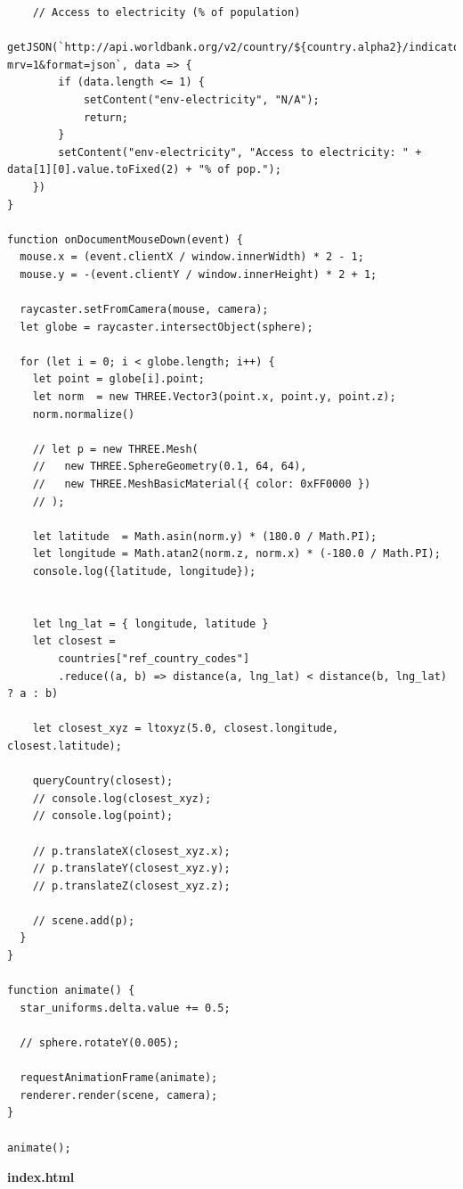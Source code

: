 \begin{lstlisting}
    // Access to electricity (% of population)
    getJSON(`http://api.worldbank.org/v2/country/${country.alpha2}/indicator/EG.ELC.ACCS.ZS?mrv=1&format=json`, data => {
        if (data.length <= 1) {
            setContent("env-electricity", "N/A");
            return;
        }
        setContent("env-electricity", "Access to electricity: " + data[1][0].value.toFixed(2) + "% of pop.");
    })
}

function onDocumentMouseDown(event) {
  mouse.x = (event.clientX / window.innerWidth) * 2 - 1;
  mouse.y = -(event.clientY / window.innerHeight) * 2 + 1;

  raycaster.setFromCamera(mouse, camera);
  let globe = raycaster.intersectObject(sphere);

  for (let i = 0; i < globe.length; i++) {
    let point = globe[i].point;
    let norm  = new THREE.Vector3(point.x, point.y, point.z);
    norm.normalize()

    // let p = new THREE.Mesh(
    //   new THREE.SphereGeometry(0.1, 64, 64),
    //   new THREE.MeshBasicMaterial({ color: 0xFF0000 })
    // );

    let latitude  = Math.asin(norm.y) * (180.0 / Math.PI);
    let longitude = Math.atan2(norm.z, norm.x) * (-180.0 / Math.PI);
    console.log({latitude, longitude});


    let lng_lat = { longitude, latitude }
    let closest =
        countries["ref_country_codes"]
        .reduce((a, b) => distance(a, lng_lat) < distance(b, lng_lat) ? a : b)

    let closest_xyz = ltoxyz(5.0, closest.longitude, closest.latitude);

    queryCountry(closest);
    // console.log(closest_xyz);
    // console.log(point);

    // p.translateX(closest_xyz.x);
    // p.translateY(closest_xyz.y);
    // p.translateZ(closest_xyz.z);

    // scene.add(p);
  }
}

function animate() {
  star_uniforms.delta.value += 0.5;

  // sphere.rotateY(0.005);

  requestAnimationFrame(animate);
  renderer.render(scene, camera);
}

animate();
\end{lstlisting}
\textbf{index.html}
